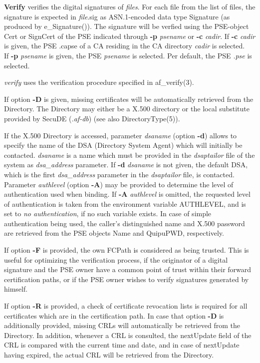 {\bf Verify} verifies the digital signatures of {\em files}. For each file from the list of files, 
the signature is expected in {\em file}.sig
as ASN.1-encoded data type Signature (as produced by e\_Signature()). The signature will be verfied using 
the PSE-object Cert or SignCert
of the PSE indicated through {\bf -p} {\em psename} or {\bf -c} {\em cadir}.
If {\bf -c} {\em cadir} is given, the PSE .capse of a CA residing in the CA directory {\em cadir}
is selected. \\
If {\bf -p} {\em psename} is given, the PSE {\em psename} is selected. Per default, the PSE {\em .pse} 
is selected.

{\em verify} uses the verification procedure specified in af\_verify(3).

If option {\bf -D} is given, missing certificates will be automatically retrieved from the Directory.
The Directory may either be a X.500 directory or the local substitute provided by 
SecuDE ({\em .af-db}) (see also DirectoryType(5)).

If the X.500 Directory is accessed, parameter {\em dsaname} (option {\bf -d}) allows to specify the name of the DSA (Directory System Agent) which
will initially be contacted. {\em dsaname} is a name which must be provided in the 
{\em dsaptailor} file of the system as {\em dsa\_address} parameter. If {\bf -d} {\em dsaname} is
not given, the default DSA, which is the first {\em dsa\_address} parameter in the {\em dsaptailor} 
file, is contacted.
Parameter {\em authlevel} (option {\bf -A}) may be provided to determine the level of authentication used when binding. If {\bf -A} {\em authlevel} is omitted, the requested 
level of authentication is taken from the environment variable AUTHLEVEL, and is set to {\em no 
authentication}, if no such variable exists.
In case of simple authentication being used, the caller's distinguished name and
X.500 password are retrieved from the PSE objects Name and QuipuPWD, respectively.

If option {\bf -F} is provided, the own FCPath is considered as being trusted.
This is useful for optimizing the verification process,
if the originator of a digital signature and the PSE owner have a common point of trust
within their forward certification paths, or if the PSE owner wishes to verify signatures
generated by himself.

If option {\bf -R} is provided, a check of certificate revocation lists is required for all certificates
which are in the certification path. In case that option {\bf -D} is additionally provided, missing CRLs will
automatically be retrieved from the Directory. In addition, whenever a CRL is consulted, the 
nextUpdate field of the CRL is compared with the current time and date, and in case of nextUpdate
having expired, the actual CRL will be retrieved from the Directory.

